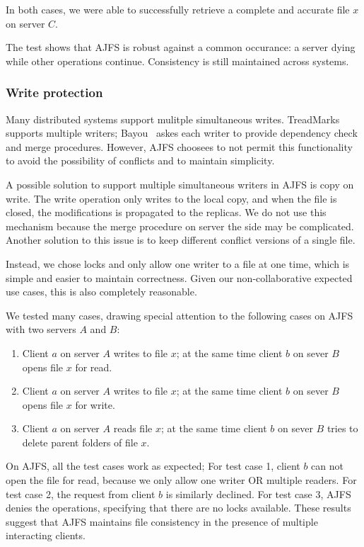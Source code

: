 In both cases, we were able to successfully retrieve a complete and accurate
file $x$ on server $C$.

The test shows that AJFS is robust against a common occurance: a server dying
while other operations continue. Consistency is still maintained across systems.

\subsubsection{Write protection}

Many distributed systems support mulitple simultaneous writes.
TreadMarks~\cite{treadmarks} supports multiple writers; Bayou~\cite{bayou} askes
each writer to provide dependency check and merge procedures.
However, AJFS choosees to not permit this functionality to avoid the possibility
of conflicts and to maintain simplicity.

A possible solution to support multiple simultaneous writers in AJFS is copy on
write. The write operation only writes to the local copy, and when the file is
closed, the modifications is propagated to the replicas. We do not use this
mechanism because the merge procedure on server the side may be complicated.
Another solution to this issue is to keep different conflict versions of a
single file. 

Instead, we chose locks and only allow one writer to a file at one time, which
is simple and easier to maintain correctness. Given our non-collaborative
expected use cases, this is also completely reasonable.

We tested many cases, drawing special attention to the following cases on AJFS
with two servers $A$ and $B$:
\begin{enumerate}
\item Client $a$ on server $A$ writes to file $x$; at the same time client $b$ on
sever $B$ opens file $x$ for read.
\item Client $a$ on server $A$ writes to file $x$; at the same time client $b$ on
sever $B$ opens file $x$ for write.
\item Client $a$ on server $A$ reads file $x$; at the same time client $b$ on
    sever $B$ tries to delete parent folders of file $x$.
\end{enumerate}

On AJFS, all the test cases work as expected; For test case 1, client $b$ can
not open the file for read, because we only allow one writer OR multiple
readers. For test case 2, the request from client $b$ is similarly declined. For
test case 3, AJFS denies the operations, specifying that there are no locks
available. These results suggest that AJFS maintains file consistency in the
presence of multiple interacting clients.

